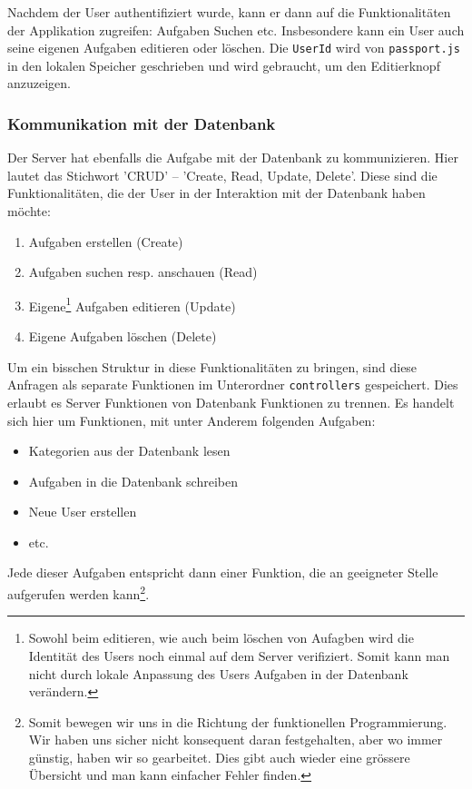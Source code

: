Nachdem der User authentifiziert wurde, kann er dann auf die Funktionalitäten der Applikation zugreifen: Aufgaben Suchen etc. Insbesondere kann ein User auch seine eigenen Aufgaben editieren oder löschen. Die \verb|UserId| wird von \verb|passport.js| in den lokalen Speicher geschrieben und wird gebraucht, um den Editierknopf anzuzeigen. 

\subsubsection{Kommunikation mit der Datenbank}

Der Server hat ebenfalls die Aufgabe mit der Datenbank zu kommunizieren. Hier lautet das Stichwort 'CRUD' -- 'Create, Read, Update, Delete'. Diese sind die Funktionalitäten, die der User in der Interaktion mit der Datenbank haben möchte:
\begin{enumerate}
    \item Aufgaben erstellen (Create)
    \item Aufgaben suchen resp. anschauen (Read)
    \item Eigene\footnote{Sowohl beim editieren, wie auch beim löschen von Aufagben wird die Identität des Users noch einmal auf dem Server verifiziert. Somit kann man nicht durch lokale Anpassung des Users Aufgaben in der Datenbank verändern.} Aufgaben editieren (Update)
    \item Eigene Aufgaben löschen (Delete)
\end{enumerate}

Um ein bisschen Struktur in diese Funktionalitäten zu bringen, sind diese Anfragen als separate Funktionen im Unterordner \verb|controllers| gespeichert. Dies erlaubt es Server Funktionen von Datenbank Funktionen zu trennen. Es handelt sich hier um Funktionen, mit unter Anderem folgenden Aufgaben:
\begin{itemize}
    \item Kategorien aus der Datenbank lesen
    \item Aufgaben in die Datenbank schreiben
    \item Neue User erstellen
    \item etc.
\end{itemize}

Jede dieser Aufgaben entspricht dann einer Funktion, die an geeigneter Stelle aufgerufen werden kann\footnote{Somit bewegen wir uns in die Richtung der funktionellen Programmierung. Wir haben uns sicher nicht konsequent daran festgehalten, aber wo immer günstig, haben wir so gearbeitet. Dies gibt auch wieder eine grössere Übersicht und man kann einfacher Fehler finden.}. 

